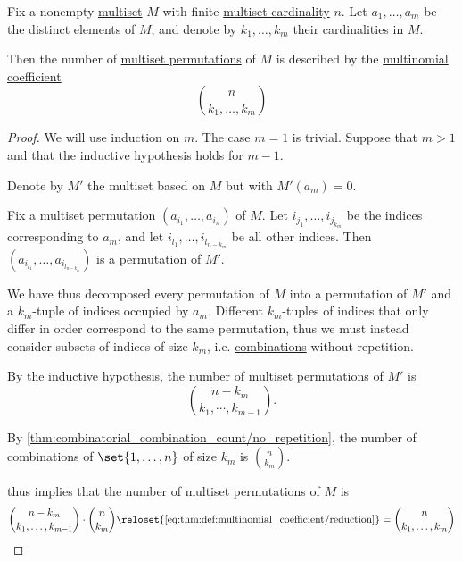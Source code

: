 \begin{proposition}\label{thm:multiset_permutation_count}
  Fix a nonempty \hyperref[def:multiset]{multiset} \( M \) with finite \hyperref[def:multiset_cardinality]{multiset cardinality} \( n \). Let \( a_1, \ldots, a_m \) be the distinct elements of \( M \), and denote by \( k_1, \ldots, k_m \) their cardinalities in \( M \).

  Then the number of \hyperref[def:multiset_permutation]{multiset permutations} of \( M \) is described by the \hyperref[def:multinomial_coefficient]{multinomial coefficient}
  \begin{equation}\label{eq:thm:multiset_permutation_count}
    \binom n {k_1, \ldots, k_m}
  \end{equation}
\end{proposition}
\begin{proof}
  We will use induction on \( m \). The case \( m = 1 \) is trivial. Suppose that \( m > 1 \) and that the inductive hypothesis holds for \( m - 1 \).

  Denote by \( M' \) the multiset based on \( M \) but with \( M'(a_m) = 0 \).

  Fix a multiset permutation \( (a_{i_1}, \ldots, a_{i_n}) \) of \( M \). Let \( i_{j_1}, \ldots, i_{j_{k_m}} \) be the indices corresponding to \( a_m \), and let \( i_{l_1}, \ldots, i_{l_{n - k_m}} \) be all other indices. Then \( (a_{i_{l_1}}, \ldots, a_{i_{l_{n - k_m}}}) \) is a permutation of \( M' \).

  We have thus decomposed every permutation of \( M \) into a permutation of \( M' \) and a \( k_m \)-tuple of indices occupied by \( a_m \). Different \( k_m \)-tuples of indices that only differ in order correspond to the same permutation, thus we must instead consider subsets of indices of size \( k_m \), i.e. \hyperref[def:combinatorial_combination]{combinations} without repetition.

  By the inductive hypothesis, the number of multiset permutations of \( M' \) is
  \begin{equation*}
    \binom {n - k_m} {k_1, \cdots, k_{m-1}}.
  \end{equation*}

  By \cref{thm:combinatorial_combination_count/no_repetition}, the number of combinations of \( \set{ 1, \ldots, n } \) of size \( k_m \) is \( \binom n {k_m} \).

   thus implies that the number of multiset permutations of \( M \) is
  \begin{equation*}
    \binom {n - k_m} {k_1, \ldots, k_{m-1}}
    \cdot
    \binom n {k_m}
    \reloset {\eqref{eq:thm:def:multinomial_coefficient/reduction}} =
    \binom n {k_1, \ldots, k_m}
  \end{equation*}
\end{proof}
